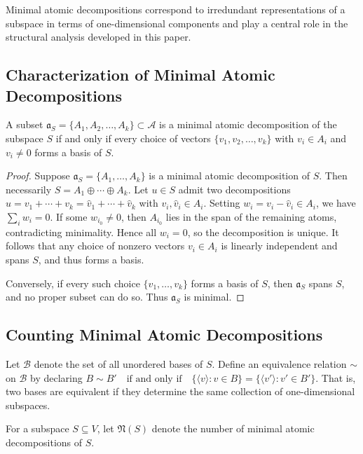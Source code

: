 \documentclass{svproc}
\begin{document}
Minimal atomic decompositions correspond to irredundant representations of a
subspace in terms of one-dimensional components and play a central role in the
structural analysis developed in this paper.

\subsection{Characterization of Minimal Atomic Decompositions} 

\begin{lemma}
A subset $\mathfrak a_S=\{A_1,A_2,\dots,A_k\}\subset \mathcal A$ is a minimal atomic
decomposition of the subspace $S$ if and only if every choice of vectors
$\{v_1,v_2,\ldots,v_k\}$ with $v_i\in A_i$ and $v_i\neq 0$ forms a basis of $S$.
\end{lemma}

\begin{proof}
Suppose $\mathfrak a_S=\{A_1,\dots,A_k\}$ is a minimal atomic decomposition of $S$.
Then necessarily
\(
S = A_1 \oplus \cdots \oplus A_k.
\)
Let $u\in S$ admit two decompositions
$u=v_1+\cdots+v_k=\hat v_1+\cdots+\hat v_k$ with $v_i,\hat v_i\in A_i$.
Setting $w_i=v_i-\hat v_i\in A_i$, we have $\sum_i w_i=0$.
If some $w_{i_0}\neq 0$, then $A_{i_0}$ lies in the span of the remaining atoms,
contradicting minimality.
Hence all $w_i=0$, so the decomposition is unique.
It follows that any choice of nonzero vectors $v_i\in A_i$ is linearly independent
and spans $S$, and thus forms a basis.

Conversely, if every such choice $\{v_1,\ldots,v_k\}$ forms a basis of $S$, then
$\mathfrak a_S$ spans $S$, and no proper subset can do so.
Thus $\mathfrak a_S$ is minimal.
\end{proof}

\subsection{Counting Minimal Atomic Decompositions}

Let $\mathcal B$ denote the set of all unordered bases of $S$.
Define an equivalence relation $\sim$ on $\mathcal B$ by declaring
\(
B \sim B'
\quad\text{if and only if}\quad
\{\langle v\rangle : v\in B\} = \{\langle v'\rangle : v'\in B'\}.
\)
That is, two bases are equivalent if they determine the same collection of
one-dimensional subspaces.

\begin{definition}
For a subspace $S\subseteq V$, let $\mathfrak N(S)$ denote the number of minimal
atomic decompositions of $S$.
\end{definition}
\end{document}
